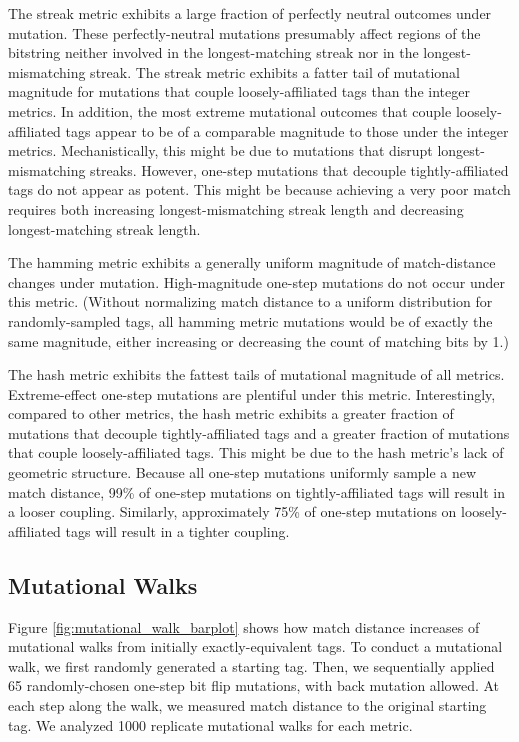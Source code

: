 The streak metric exhibits a large fraction of perfectly neutral outcomes under mutation.
These perfectly-neutral mutations presumably affect regions of the bitstring neither involved in the longest-matching streak nor in the longest-mismatching streak.
The streak metric exhibits a fatter tail of mutational magnitude for mutations that couple loosely-affiliated tags than the integer metrics. %
In addition, the most extreme mutational outcomes that couple loosely-affiliated tags appear to be of a comparable magnitude to those under the integer metrics.
Mechanistically, this might be due to mutations that disrupt longest-mismatching streaks.
However, one-step mutations that decouple tightly-affiliated tags do not appear as potent.
This might be because achieving a very poor match requires both increasing longest-mismatching streak length and decreasing longest-matching streak length.

The hamming metric exhibits a generally uniform magnitude of match-distance changes under mutation.
High-magnitude one-step mutations do not occur under this metric.
(Without normalizing match distance to a uniform distribution for randomly-sampled tags, all hamming metric mutations would be of exactly the same magnitude, either increasing or decreasing the count of matching bits by 1.)

The hash metric exhibits the fattest tails of mutational magnitude of all metrics.
Extreme-effect one-step mutations are plentiful under this metric.
Interestingly, compared to other metrics, the hash metric exhibits a greater fraction of mutations that decouple tightly-affiliated tags and a greater fraction of mutations that couple loosely-affiliated tags.
This might be due to the hash metric's lack of geometric structure.
Because all one-step mutations uniformly sample a new match distance, 99\% of one-step mutations on tightly-affiliated tags will result in a looser coupling.
Similarly, approximately 75\% of one-step mutations on loosely-affiliated tags will result in a tighter coupling.

\subsection{Mutational Walks}



Figure \ref{fig:mutational_walk_barplot} shows how match distance increases of mutational walks from initially exactly-equivalent tags.
To conduct a mutational walk, we first randomly generated a starting tag.
Then, we sequentially applied 65 randomly-chosen one-step bit flip mutations, with back mutation allowed.
At each step along the walk, we measured match distance to the original starting tag.
We analyzed 1000 replicate mutational walks for each metric.

